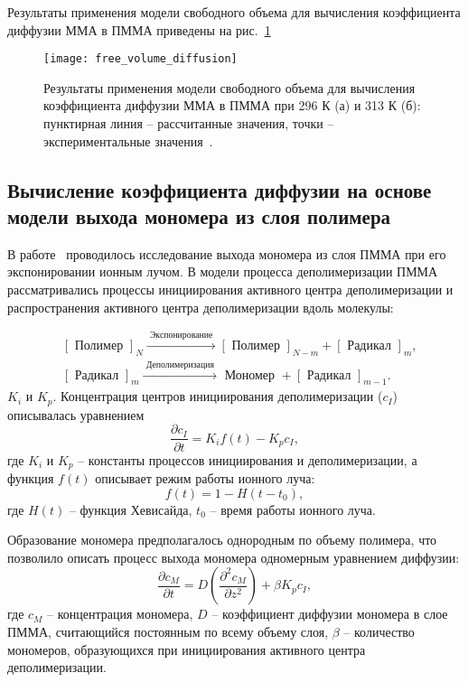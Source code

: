 Результаты применения модели свободного объема для вычисления коэффициента диффузии ММА в ПММА приведены на рис.~\ref{fig:free_volume_diffusion}

\begin{figure}
	\texttt{[image: free\_volume\_diffusion]}
	\caption{Результаты применения модели свободного объема для вычисления коэффициента диффузии ММА в ПММА при 296 К (а) и 313 К (б): пунктирная линия -- рассчитанные значения, точки -- экспериментальные значения~\cite{Griffiths_MMA_PMMA_diffusion}.}
	\label{fig:free_volume_diffusion}
\end{figure}


\subsection{Вычисление коэффициента диффузии на основе модели выхода мономера из слоя полимера}
В работе~\cite{Fragala_3_diffusion} проводилось исследование выхода мономера из слоя ПММА при его экспонировании ионным лучом. В модели процесса деполимеризации ПММА рассматривались процессы инициирования активного центра деполимеризации и распространения активного центра деполимеризации вдоль молекулы:

\begin{equation}
	\begin{aligned}
		&{[\text { Полимер }]_N \stackrel{\text { Экспонирование }}{\longrightarrow}[\text { Полимер }]_{N-m}+[\text { Радикал }]_m,} \\
		&{[\text { Радикал }]_m \stackrel{\text { Деполимеризация }}{\longrightarrow} \text { Мономер }+[\text { Радикал }]_{m-1} .}
	\end{aligned}
\end{equation}
$K_i$ и $K_p$.
Концентрация центров инициирования деполимеризации ($c_I$) описывалась уравнением
\begin{equation}
	\frac{\partial c_I}{\partial t}=K_i f(t)-K_p c_I,
\end{equation}
где $K_i$ и $K_p$ -- константы процессов инициирования и деполимеризации, а функция $f(t)$ описывает режим работы ионного луча:
\begin{equation}
	f(t) = 1 - H(t - t_0),
\end{equation}
где $H(t)$ -- функция Хевисайда,  $t_0$ -- время работы ионного луча.

Образование мономера предполагалось однородным по объему полимера, что позволило описать процесс выхода мономера одномерным уравнением диффузии:
\begin{equation} \label{eq:raduino_diff_eq}
	\frac{\partial c_M}{\partial t}=D\left(\frac{\partial^2 c_M}{\partial z^2}\right)+\beta K_p c_I,
\end{equation}
где $c_M$ -- концентрация мономера, $D$ -- коэффициент диффузии мономера в слое ПММА, считающийся постоянным по всему объему слоя, $\beta$ -- количество мономеров, образующихся при инициирования активного центра деполимеризации.

